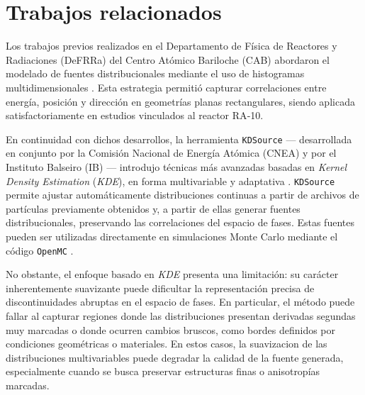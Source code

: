 
\section{Trabajos relacionados}

Los trabajos previos realizados en el Departamento de Física de Reactores y Radiaciones (DeFRRa) del Centro Atómico Bariloche (CAB) \cite{DeptoReactoresNeutronesCAB2025} abordaron el modelado de fuentes distribucionales mediante el uso de histogramas multidimensionales \cite{Fairhurst2017Hist, Ayala2019Hist, Abbate2020Hist}. Esta estrategia permitió capturar correlaciones entre energía, posición y dirección en geometrías planas rectangulares, siendo aplicada satisfactoriamente en estudios vinculados al reactor RA‑10.

En continuidad con dichos desarrollos, la herramienta \texttt{KDSource} — desarrollada en conjunto por la Comisión Nacional de Energía Atómica (CNEA) \cite{CNEA2025} y por el Instituto Balseiro (IB) \cite{IB2025}— introdujo técnicas más avanzadas basadas en \textit{Kernel Density Estimation} (\textit{KDE}), en forma multivariable y adaptativa \cite{Abbate2021KDSource, Schmidt2022KDSourcePaper, Fox2022KDE, Gimenez2024KDSourceOpenMC}. \texttt{KDSource} permite ajustar automáticamente distribuciones continuas a partir de archivos de partículas previamente obtenidos y, a partir de ellas generar fuentes distribucionales, preservando las correlaciones del espacio de fases. Estas fuentes pueden ser utilizadas directamente en simulaciones Monte Carlo mediante el código \texttt{OpenMC} \cite{OpenMC2024}.

No obstante, el enfoque basado en \textit{KDE} presenta una limitación: su carácter inherentemente suavizante puede dificultar la representación precisa de discontinuidades abruptas en el espacio de fases. En particular, el método puede fallar al capturar regiones donde las distribuciones presentan derivadas segundas muy marcadas o donde ocurren cambios bruscos, como bordes definidos por condiciones geométricas o materiales. En estos casos, la suavizacion de las distribuciones multivariables puede degradar la calidad de la fuente generada, especialmente cuando se busca preservar estructuras finas o anisotropías marcadas.

